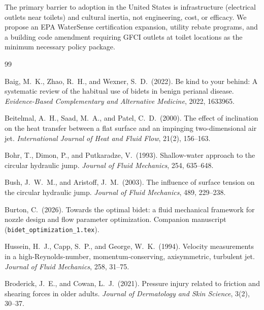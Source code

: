 \documentclass[aps,prfluids,reprint,amsmath,amssymb,floatfix]{revtex4-2}
\begin{document}
The primary barrier to adoption in the United States is infrastructure
(electrical outlets near toilets) and cultural inertia, not engineering,
cost, or efficacy. We propose an EPA WaterSense certification expansion,
utility rebate programs, and a building code amendment requiring GFCI outlets
at toilet locations as the minimum necessary policy package.

\begin{thebibliography}{99}

Baig, M.~K., Zhao, R.~H., and Wexner, S.~D.\ (2022).
Be kind to your behind: A systematic review of the habitual use of bidets
in benign perianal disease.
\textit{Evidence-Based Complementary and Alternative Medicine}, 2022, 1633965.

Beitelmal, A.~H., Saad, M.~A., and Patel, C.~D.\ (2000).
The effect of inclination on the heat transfer between a flat surface
and an impinging two-dimensional air jet.
\textit{International Journal of Heat and Fluid Flow}, 21(2), 156--163.

Bohr, T., Dimon, P., and Putkaradze, V.\ (1993).
Shallow-water approach to the circular hydraulic jump.
\textit{Journal of Fluid Mechanics}, 254, 635--648.

Bush, J.~W.~M., and Aristoff, J.~M.\ (2003).
The influence of surface tension on the circular hydraulic jump.
\textit{Journal of Fluid Mechanics}, 489, 229--238.

Burton, C.\ (2026).
Towards the optimal bidet: a fluid mechanical framework for nozzle
design and flow parameter optimization.
Companion manuscript (\texttt{bidet\_optimization\_1.tex}).

Hussein, H.~J., Capp, S.~P., and George, W.~K.\ (1994).
Velocity measurements in a high-Reynolds-number, momentum-conserving,
axisymmetric, turbulent jet.
\textit{Journal of Fluid Mechanics}, 258, 31--75.

Broderick, J.~E., and Cowan, L.~J.\ (2021).
Pressure injury related to friction and shearing forces in older adults.
\textit{Journal of Dermatology and Skin Science}, 3(2), 30--37.


\end{thebibliography}
\end{document}
